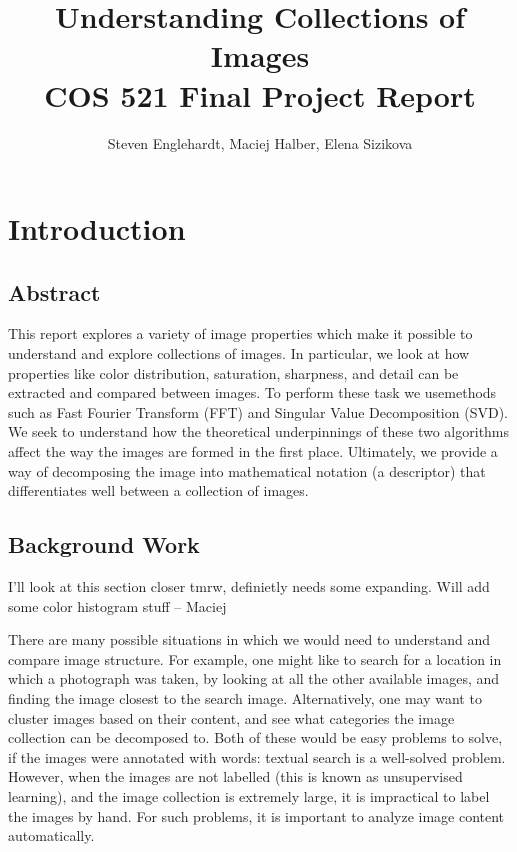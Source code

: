 \documentclass{report}
\author{Steven Englehardt, Maciej Halber, Elena Sizikova}
\title{Understanding Collections of Images \\ \small{COS 521 Final Project Report}}
\begin{document}
\maketitle
\tableofcontents

\chapter{Introduction}
\section{Abstract}
This report explores a variety of image properties which make it possible to understand and explore collections of images. In particular, we look at how properties like color distribution, saturation, sharpness, and detail can be extracted and compared between images. To perform these task we usemethods such as Fast Fourier Transform (FFT) and Singular Value Decomposition (SVD). We seek to understand how the theoretical underpinnings of these two algorithms affect the way the images are formed in the first place. Ultimately, we provide a way of decomposing the image into mathematical notation (a descriptor) that differentiates well between a collection of images.

\section{Background Work}
{\color{red} I'll look at this section closer tmrw, definietly needs some expanding. Will add some color histogram stuff  -- Maciej}

There are many possible situations in which we would need to understand and compare image structure. For example, one might like to search for a location in which a photograph was taken, by looking at all the other available images, and finding the image closest to the search image. Alternatively, one may want to cluster images based on their content, and see what categories the image collection can be decomposed to. Both of these would be easy problems to solve, if the images were annotated with words: textual search is a well-solved problem. However, when the images are not labelled (this is known as unsupervised learning), and the image collection is extremely large, it is impractical to label the images by hand. For such problems, it is important to analyze image content automatically.
\end{document}
